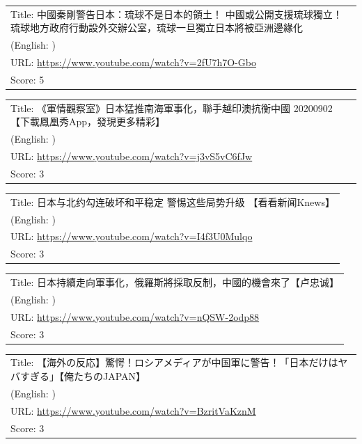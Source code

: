 \documentclass{article}
\begin{document}
\noindent
\begin{tabular}{p{}}
Title: 中國秦剛警告日本：琉球不是日本的領土！ 中國或公開支援琉球獨立！ 琉球地方政府行動設外交辦公室，琉球一旦獨立日本將被亞洲邊緣化 \\
(English: ) \\
URL: \url{https://www.youtube.com/watch?v=2fU7h7O-Gbo} \\
Score: 5 \\
\end{tabular}
\vspace{0.5em}

\noindent
\begin{tabular}{p{}}
Title: 《軍情觀察室》日本猛推南海軍事化，聯手越印澳抗衡中國 20200902【下載鳳凰秀App，發現更多精彩】 \\
(English: ) \\
URL: \url{https://www.youtube.com/watch?v=j3vS5vC6fJw} \\
Score: 3 \\
\end{tabular}
\vspace{0.5em}

\noindent
\begin{tabular}{p{}}
Title: 日本与北约勾连破坏和平稳定 警惕这些局势升级 【看看新闻Knews】 \\
(English: ) \\
URL: \url{https://www.youtube.com/watch?v=I4f3U0Mulqo} \\
Score: 3 \\
\end{tabular}
\vspace{0.5em}

\noindent
\begin{tabular}{p{}}
Title: 日本持續走向軍事化，俄羅斯將採取反制，中國的機會來了【卢忠诚】 \\
(English: ) \\
URL: \url{https://www.youtube.com/watch?v=nQSW-2odp88} \\
Score: 3 \\
\end{tabular}
\vspace{0.5em}

\noindent
\begin{tabular}{p{}}
Title: 【海外の反応】驚愕！ロシアメディアが中国軍に警告！「日本だけはヤバすぎる」【俺たちのJAPAN】 \\
(English: ) \\
URL: \url{https://www.youtube.com/watch?v=BzritVaKznM} \\
Score: 3 \\
\end{tabular}
\vspace{0.5em}
\end{document}
